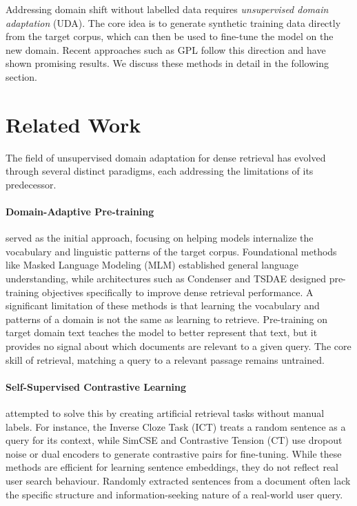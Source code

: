 \documentclass[thesis]{cluu}
\begin{document}
Addressing domain shift without labelled data requires 
\textit{unsupervised domain adaptation} (UDA). The core idea is to 
generate synthetic training data directly from the target corpus, 
which can then be used to fine-tune the model on the new domain. 
Recent approaches such as GPL \parencite{wang-etal-2022-gpl} follow 
this direction and have shown promising results. We discuss these 
methods in detail in the following section.

\section{Related Work}

The field of unsupervised domain adaptation for dense retrieval has 
evolved through several distinct paradigms, each addressing the 
limitations of its predecessor.

\paragraph{\textbf{Domain-Adaptive Pre-training}}served as the initial 
approach, focusing on helping models internalize the vocabulary and 
linguistic patterns of the target corpus. Foundational methods like 
Masked Language Modeling (MLM) \parencite{devlin-etal-2019-bert} 
established general language understanding, while architectures such 
as Condenser \parencite{gao-callan-2021-condenser} and TSDAE 
\parencite{wang-etal-2021-tsdae} designed pre-training objectives 
specifically to improve dense retrieval performance. A significant limitation of these methods is that learning the 
vocabulary and patterns of a domain is not the same as learning 
to retrieve. Pre-training on target domain text teaches the model 
to better represent that text, but it provides no signal about 
which documents are relevant to a given query. The core skill of 
retrieval, matching a query to a relevant passage remains untrained.

\paragraph{\textbf{Self-Supervised Contrastive Learning}} attempted to solve 
this by creating artificial retrieval tasks without manual labels. 
For instance, the Inverse Cloze Task (ICT) \parencite{lee-etal-2019-latent} 
treats a random sentence as a query for its context, while SimCSE 
\parencite{gao-etal-2021-simcse} and Contrastive Tension (CT) 
\parencite{carlsson2021semantic} use dropout noise or dual encoders 
to generate contrastive pairs for fine-tuning. While these methods 
are efficient for learning sentence embeddings, they do not reflect 
real user search behaviour. Randomly extracted sentences from a 
document often lack the specific structure and information-seeking 
nature of a real-world user query.
\end{document}
